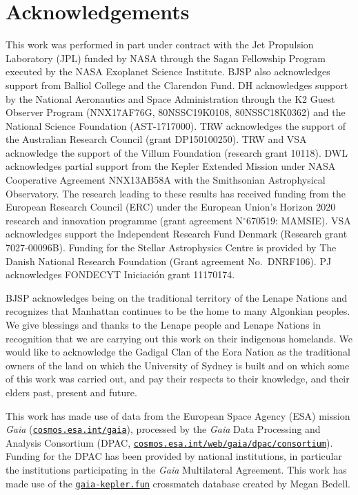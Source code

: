 \documentclass[modern]{aastex62}
\begin{document}
\section*{Acknowledgements} %

This work was performed in part under contract with the Jet Propulsion Laboratory (JPL) funded by NASA through the Sagan Fellowship Program executed by the NASA Exoplanet Science Institute. BJSP also acknowledges support from Balliol College and the Clarendon Fund. DH acknowledges support by the National Aeronautics and Space Administration through the K2 Guest Observer Program (NNX17AF76G, 80NSSC19K0108, 80NSSC18K0362) and the National Science Foundation (AST-1717000). TRW acknowledges the support of the Australian Research Council (grant DP150100250). TRW and VSA acknowledge
the support of the Villum Foundation (research grant 10118). DWL acknowledges partial support from the Kepler Extended Mission under NASA Cooperative Agreement NNX13AB58A with the Smithsonian Astrophysical Observatory. The research leading to these results has received funding from the European Research Council (ERC) under the European Union's Horizon 2020 research and innovation programme (grant agreement N$^\circ$670519: MAMSIE). VSA acknowledges support the Independent Research Fund Denmark (Research grant 7027-00096B). Funding for the Stellar Astrophysics Centre is provided by The Danish National Research Foundation (Grant agreement No.~DNRF106). PJ acknowledges FONDECYT Iniciaci\'on grant 11170174. 

BJSP acknowledges being on the traditional territory of the Lenape Nations and recognizes that Manhattan continues to be the home to many Algonkian peoples. We give blessings and thanks to the Lenape people and Lenape Nations in recognition that we are carrying out this work on their indigenous homelands. We would like to acknowledge the Gadigal Clan of the Eora Nation as the traditional owners of the land on which the University of Sydney is built and on which some of this work was carried out, and pay their respects to their knowledge, and their elders past, present and future. %

This work has made use of data from the European Space Agency (ESA) mission
{\it Gaia} (\href{https://www.cosmos.esa.int/gaia}{\nolinkurl{cosmos.esa.int/gaia}}), processed by the {\it Gaia}
Data Processing and Analysis Consortium (DPAC, \href{https://www.cosmos.esa.int/web/gaia/dpac/consortium}{\nolinkurl{cosmos.esa.int/web/gaia/dpac/consortium}}). Funding for the DPAC
has been provided by national institutions, in particular the institutions
participating in the {\it Gaia} Multilateral Agreement. This work has made use of the \href{https://gaia-kepler.fun}{\nolinkurl{gaia-kepler.fun}} crossmatch database created by Megan Bedell.
\end{document}
